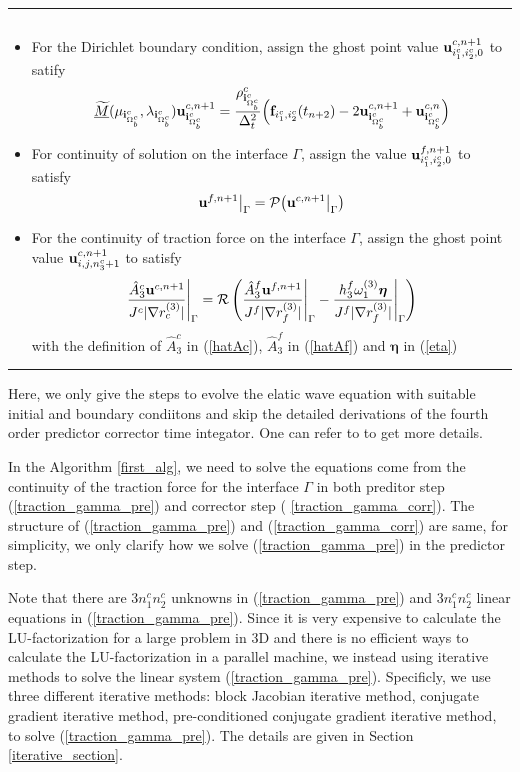 \documentclass[a4paper]{article}
\makeatletter
\newenvironment{breakablealgorithm}
{%
	\begin{center}
		\refstepcounter{algorithm}%
		\hrule height.8pt depth0pt \kern2pt%
		\renewcommand{\caption}[2][\relax]{%
			{\raggedright\textbf{\ALG@name~\thealgorithm} ##2\par}%
			\ifx\relax##1\relax %
			\addcontentsline{loa}{algorithm}{\protect\numberline{\thealgorithm}##2}%
			\else %
			\addcontentsline{loa}{algorithm}{\protect\numberline{\thealgorithm}##1}%
			\fi
			\kern2pt\hrule\kern2pt
		}
	}{%
		\kern2pt\hrule\relax%
	\end{center}
}
\newcommand{\wt}{\widetilde}
\makeatother
\begin{document}
\begin{breakablealgorithm}
\begin{itemize}
{\begin{equation*}
 	\end{equation*}	
 }
 \item {For the Dirichlet boundary condition, assign the ghost point value ${\bf u}^{c,n+1}_{i^c_1,i^c_2,0}$ to satify
 	\begin{equation*}
 	\uline{\wt{M}}(\mu_{{\bf i}^c_{\Omega^c_b}},\lambda_{{\bf i}^c_{\Omega^c_b}}){\bf u}_{{\bf i}^c_{\Omega^c_b}}^{c,n+1} = \frac{\rho^c_{{\bf i}^c_{\Omega^c_b}}}{\Delta_t^2}\Big({\bf f} _{i^c_1,i^c_2}(t_{n+2})-2{\bf u}_{{\bf i}^c_{\Omega^c_b}}^{c,n+1}+{\bf u}_{{\bf i}^c_{\Omega^c_b}}^{c,n}\Big)
 	\end{equation*}
 }
 \item{For continuity of solution on the interface $\Gamma$, assign the value ${\bf u}^{f,n+1}_{i^c_1,i^c_2,0}$ to satisfy
	\begin{equation*}
	{\bf u}^{f,n+1}\big|_{\Gamma} = \mathcal{P}\big({\bf u}^{c,n+1}\big|_{\Gamma}\big)
	\end{equation*}
}
\item{For the continuity of traction force on the interface $\Gamma$, assign the ghost point value ${\bf u}^{c,n+1}_{i,j,n_3^c+1}$ to satisfy
	\begin{equation}\label{traction_gamma_corr}
	\frac{\hat{A}_3^c{\bf u}^{c,n+1}}{J^c|\nabla r_c^{(3)}|}\Bigg|_{\Gamma} = \mathcal{R}\left(\frac{\hat{A}_3^f{\bf u}^{f,n+1}}{J^f|\nabla r_f^{(3)}|}\Bigg|_{\Gamma} - \frac{h_3^f\omega_1^{(3)}{\bm \eta}}{J^f|\nabla r_f^{(3)}|}\Bigg|_{\Gamma}\right)
	\end{equation}
	with the definition of $\hat{A}^c_3$ in (\ref{hatAc}), $\hat{A}^f_3$ in (\ref{hatAf}) and ${\bm \eta}$ in (\ref{eta})
}
	\end{itemize}
\end{breakablealgorithm}
Here, we only give the steps to evolve the elatic wave equation with suitable initial and boundary condiitons and skip the detailed derivations of the fourth order predictor corrector time integator. One can refer to \cite{?} to get more details.

In the Algorithm \ref{first_alg}, we need to solve the equations come from the continuity of the traction force for the interface $\Gamma$ in both preditor step (\ref{traction_gamma_pre}) and corrector step (
\ref{traction_gamma_corr}). The structure of (\ref{traction_gamma_pre}) and (\ref{traction_gamma_corr}) are same, for simplicity, we only clarify how we solve (\ref{traction_gamma_pre}) in the predictor step.

Note that there are $3n_1^cn_2^c$ unknowns in (\ref{traction_gamma_pre}) and $3n_1^cn_2^c$ linear equations in (\ref{traction_gamma_pre}). Since it is very expensive to calculate the LU-factorization for a large problem in $3$D and there is no efficient ways to calculate the LU-factorization in a parallel machine, we instead using iterative methods to solve the linear system (\ref{traction_gamma_pre}). Specificly, we use three different iterative methods: block Jacobian iterative method, conjugate gradient iterative method, pre-conditioned conjugate gradient iterative method, to solve (\ref{traction_gamma_pre}). The details are given in Section \ref{iterative_section}.
\end{document}
